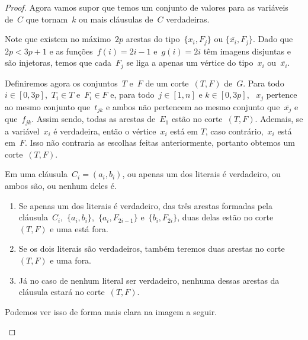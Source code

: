 \begin{proof}
		\bigskip
		\bigskip

		Agora vamos supor que temos um conjunto de valores para 
		as variáveis de~$C$ que tornam~$k$ ou mais cláusulas
		de~$C$ verdadeiras.

		Note que existem no máximo~$2p$ arestas do 
		tipo~${\{x_i,F_j\}}$ ou ${\{\overline{x_i},F_j\}}$. 
		Dado que~${2p<3p+1}$ e
		as funções~${f(i)=2i - 1}$ e~${g(i)=2i}$ têm 
		imagens disjuntas e são injetoras, 
		temos que cada~$F_j$ se liga a apenas um vértice
		do tipo~$x_i$ ou~${\overline{x_i}}$.

		Definiremos agora os
		conjuntos~$T$ e~$F$ de um corte~$(T,F)$ de~$G$.
		Para todo~${i\in[0,3p]}$,~${T_i\in T}$ 
		e~${F_i\in F}$ e,
		para todo~${j\in[1,n]}$ e ${k\in[0,3p]}$, ~$x_j$ pertence ao 
		mesmo conjunto que~$t_{jk}$ e ambos não pertencem ao mesmo 
		conjunto que~$\overline{x_j}$ e que~$f_{jk}$.
		Assim sendo, todas as arestas de~$E_1$ estão no 
		corte~$(T,F)$.
		Ademais, se a variável~$x_i$ é verdadeira,
		então o vértice~$x_i$ está em $T$, caso contrário,~$x_i$
		está em~$F$.
		Isso não contraria as escolhas feitas anteriormente, portanto 
		obtemos um corte~$(T,F)$.

		Em uma cláusula~${C_i=(a_i,b_i)}$, ou
		apenas um dos literais é verdadeiro, ou ambos são, ou nenhum
		deles é.
		\begin{enumerate}
			\item Se apenas um dos literais é verdadeiro,
			das três arestas formadas pela 
			cláusula~$C_i$,~$\{a_i,b_i\}$,~$\{a_i, F_{2i-1}\}$
			e~$\{b_i, F_{2i}\}$, duas delas
			estão no corte~$(T,F)$ e uma está fora.
			\item Se os dois literais são verdadeiros, também teremos
			duas arestas no corte~$(T,F)$ e uma fora.
			\item Já no caso de nenhum literal ser verdadeiro, nenhuma
			dessas arestas da cláusula estará no corte~$(T,F)$.
		\end{enumerate}

		Podemos ver isso de forma mais clara na imagem a seguir.

		\begin{center} \begin{tikzpicture}
			[scale=.24,auto=left,every node/.style={circle, 
			draw=black,
			fill=blue!20}]
			



\end{tikzpicture}
\end{center}
\end{proof}
